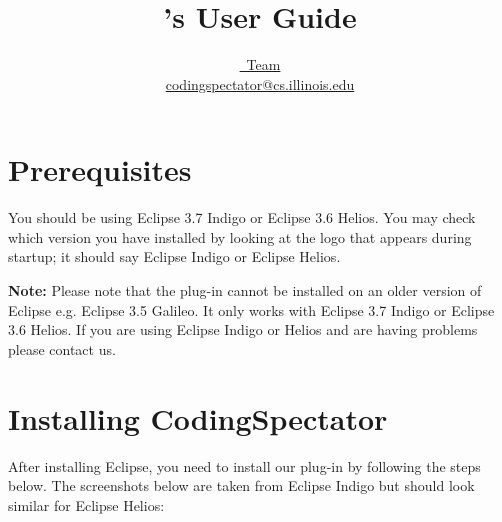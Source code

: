 \documentclass{article}
\title{\codspec's User Guide}
\author{%
%
\href{http://codingspectator.cs.illinois.edu/People/}{\codspec\ Team}\\%
%
\href{mailto:codingspectator@cs.illinois.edu}{codingspectator@cs.illinois.edu}%
%
}
\newcommand\codspec{CodingSpectator}
\newcommand\warnnote[1]{\textbf{Note: }#1}
\begin{document}
%
\maketitle
%
\tableofcontents
%
\section{Prerequisites}

You should be using Eclipse 3.7 Indigo or Eclipse 3.6 Helios. You may check
which version you have installed by looking at the logo that appears during
startup; it should say Eclipse Indigo or Eclipse Helios.

\warnnote{Please note that the plug-in cannot be installed on an older version
of Eclipse e.g. Eclipse 3.5 Galileo. It only works with Eclipse 3.7 Indigo or
Eclipse 3.6 Helios. If you are using Eclipse Indigo or Helios and are having
problems please contact us.} 

\section{Installing \codspec}

After installing Eclipse, you need to install our plug-in by following the steps
below. The screenshots below are taken from Eclipse Indigo but should look
similar for Eclipse Helios:
\end{document}
